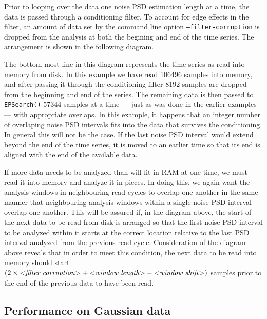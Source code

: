 \documentclass{article}
\newcommand{\function}[1]{\texttt{#1}}
\newcommand{\option}[1]{\texttt{#1}}
\newcommand{\parm}[1]{$<$\textit{#1}$>$}
\begin{document}
Prior to looping over the data one noise PSD estimation length at a time,
the data is passed through a conditioning filter.  To account for edge
effects in the filter, an amount of data set by the command line option
\option{--filter-corruption} is dropped from the analysis at both the
begining and end of the time series.  The arrangement is shown in the
following diagram.
\begin{center}

\end{center}
The bottom-most line in this diagram represents the time series as read
into memory from disk.  In this example we have read 106496 samples into
memory, and after passing it through the conditioning filter 8192 samples
are dropped from the beginning and end of the series.  The remaining data
is then passed to \function{EPSearch()} 57344 samples at a time --- just as
was done in the earlier examples --- with appropriate overlaps.  In this
example, it happens that an integer number of overlaping noise PSD
intervals fits into the data that survives the conditioning.  In general
this will not be the case.  If the last noise PSD interval would extend
beyond the end of the time series, it is moved to an earlier time so that
its end is aligned with the end of the available data.

If more data needs to be analyzed than will fit in RAM at one time, we must
read it into memory and analyze it in pieces.  In doing this, we again want
the analysis windows in neighbouring read cycles to overlap one another in
the same manner that neighbouring analysis windows within a single noise
PSD interval overlap one another.  This will be assured if, in the diagram
above, the start of the next data to be read from disk is arranged so that
the first noise PSD interval to be analyzed within it starts at the correct
location relative to the last PSD interval analyzed from the previous read
cycle.  Consideration of the diagram above reveals that in order to meet
this condition, the next data to be read into memory should start $(2
\times \mbox{\parm{filter corruption}} + \mbox{\parm{window length}} -
\mbox{\parm{window shift}})$ samples prior to the end of the previous data
to have been read.


\subsection{Performance on Gaussian data}
\end{document}
